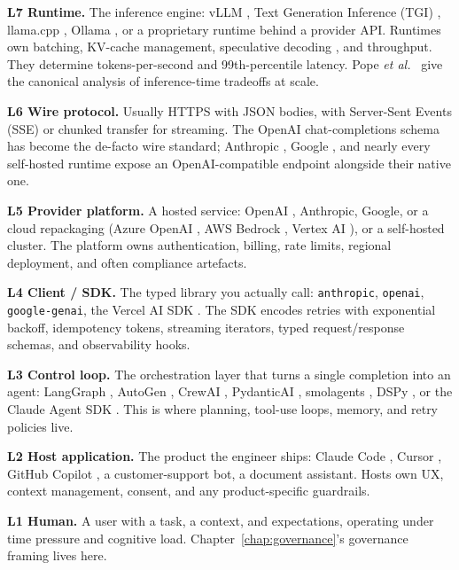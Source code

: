 \textbf{L7 Runtime.} The inference engine: vLLM
\citep{kwon2023vllm, vllm_docs}, Text Generation Inference (TGI)
\citep{tgi_docs}, llama.cpp \citep{llamacpp_docs}, Ollama
\citep{ollama_docs}, or a proprietary runtime behind a provider
API. Runtimes own batching, KV-cache management, speculative
decoding \citep{leviathan2023speculative}, and throughput. They
determine tokens-per-second and 99th-percentile latency. Pope
\emph{et al.}\ \citep{pope2023efficiently} give the canonical
analysis of inference-time tradeoffs at scale.

\textbf{L6 Wire protocol.} Usually HTTPS with JSON bodies, with
Server-Sent Events (SSE) or chunked transfer for streaming. The
OpenAI chat-completions schema has become the de-facto wire
standard; Anthropic \citep{anthropic_api_docs}, Google
\citep{google_gemini_api}, and nearly every self-hosted runtime
expose an OpenAI-compatible endpoint alongside their native one.

\textbf{L5 Provider platform.} A hosted service: OpenAI
\citep{openai_api_docs}, Anthropic, Google, or a cloud repackaging
(Azure OpenAI \citep{azure_openai_docs}, AWS Bedrock
\citep{aws_bedrock_docs}, Vertex AI \citep{gcp_vertex_docs}), or a
self-hosted cluster. The platform owns authentication, billing,
rate limits, regional deployment, and often compliance artefacts.

\textbf{L4 Client / SDK.} The typed library you actually call:
\texttt{anthropic}, \texttt{openai}, \texttt{google-genai}, the
Vercel AI SDK \citep{vercel_ai_sdk}. The SDK encodes retries with
exponential backoff, idempotency tokens, streaming iterators,
typed request/response schemas, and observability hooks.

\textbf{L3 Control loop.} The orchestration layer that turns a
single completion into an agent: LangGraph \citep{langgraph_docs},
AutoGen \citep{wu2023autogen}, CrewAI \citep{crewai_docs},
PydanticAI \citep{pydantic_ai_docs}, smolagents
\citep{smolagents_docs}, DSPy \citep{khattab2023dspy}, or the
Claude Agent SDK \citep{anthropic_agent_sdk}. This is where
planning, tool-use loops, memory, and retry policies live.

\textbf{L2 Host application.} The product the engineer ships:
Claude Code \citep{claude_code}, Cursor \citep{cursor_editor},
GitHub Copilot \citep{github_copilot}, a customer-support bot, a
document assistant. Hosts own UX, context management, consent,
and any product-specific guardrails.

\textbf{L1 Human.} A user with a task, a context, and
expectations, operating under time pressure and cognitive load.
Chapter~\ref{chap:governance}'s governance framing lives here.


